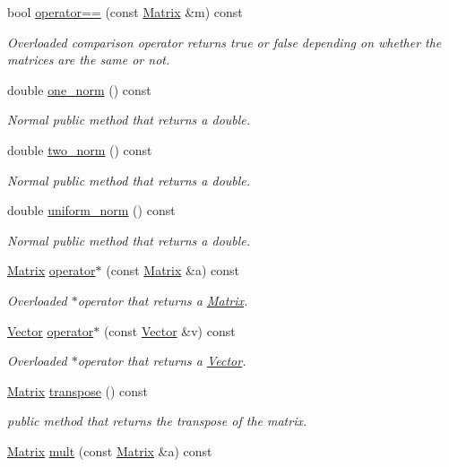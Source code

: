 \begin{DoxyCompactItemize}
bool \hyperlink{classMatrix_a5bc97450e589f9ae3a43814808645f3f}{operator==} (const \hyperlink{classMatrix}{Matrix} \&m) const 
\begin{DoxyCompactList}\small\item\em Overloaded comparison operator returns true or false depending on whether the matrices are the same or not. \end{DoxyCompactList}\item 
double \hyperlink{classMatrix_a4f7ede695709b614f2e1f6423a024201}{one\+\_\+norm} () const 
\begin{DoxyCompactList}\small\item\em Normal public method that returns a double. \end{DoxyCompactList}\item 
double \hyperlink{classMatrix_a0b738b2c1d87ec28b23c7e479d014f2a}{two\+\_\+norm} () const 
\begin{DoxyCompactList}\small\item\em Normal public method that returns a double. \end{DoxyCompactList}\item 
double \hyperlink{classMatrix_a05777a670e901010b96e9d667a4bdd3b}{uniform\+\_\+norm} () const 
\begin{DoxyCompactList}\small\item\em Normal public method that returns a double. \end{DoxyCompactList}\item 
\hyperlink{classMatrix}{Matrix} \hyperlink{classMatrix_a1fbef471bec2714e891c082a345d2274}{operator$\ast$} (const \hyperlink{classMatrix}{Matrix} \&a) const 
\begin{DoxyCompactList}\small\item\em Overloaded $\ast$operator that returns a \hyperlink{classMatrix}{Matrix}. \end{DoxyCompactList}\item 
\hyperlink{classVector}{Vector} \hyperlink{classMatrix_a31aaaadc4c2f30ce01cd70c2e0c72f6f}{operator$\ast$} (const \hyperlink{classVector}{Vector} \&v) const 
\begin{DoxyCompactList}\small\item\em Overloaded $\ast$operator that returns a \hyperlink{classVector}{Vector}. \end{DoxyCompactList}\item 
\hyperlink{classMatrix}{Matrix} \hyperlink{classMatrix_a9da9f5ee8215491cc54ecc59ddeb3f73}{transpose} () const 
\begin{DoxyCompactList}\small\item\em public method that returns the transpose of the matrix. \end{DoxyCompactList}\item 
\hyperlink{classMatrix}{Matrix} \hyperlink{classMatrix_a28ac82d2f9ec7e4f8a366ec7bd6bd54e}{mult} (const \hyperlink{classMatrix}{Matrix} \&a) const 
\end{DoxyCompactItemize}
